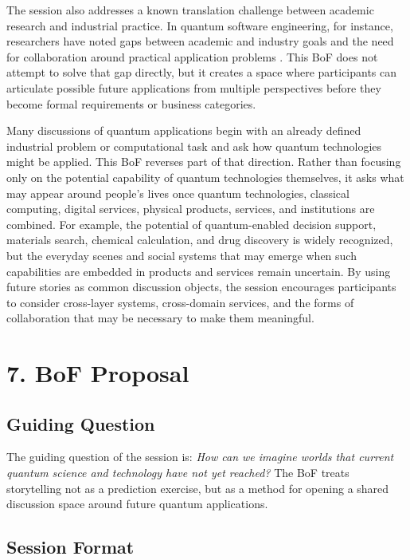 \documentclass[10pt,conference]{IEEEtran}
\begin{document}
The session also addresses a known translation challenge between academic research and industrial practice. In quantum software engineering, for instance, researchers have noted gaps between academic and industry goals and the need for collaboration around practical application problems \cite{zappin}. This BoF does not attempt to solve that gap directly, but it creates a space where participants can articulate possible future applications from multiple perspectives before they become formal requirements or business categories.

Many discussions of quantum applications begin with an already defined industrial problem or computational task and ask how quantum technologies might be applied. This BoF reverses part of that direction. Rather than focusing only on the potential capability of quantum technologies themselves, it asks what may appear around people's lives once quantum technologies, classical computing, digital services, physical products, services, and institutions are combined. For example, the potential of quantum-enabled decision support, materials search, chemical calculation, and drug discovery is widely recognized, but the everyday scenes and social systems that may emerge when such capabilities are embedded in products and services remain uncertain. By using future stories as common discussion objects, the session encourages participants to consider cross-layer systems, cross-domain services, and the forms of collaboration that may be necessary to make them meaningful.

\section*{7. BoF Proposal}

\subsection*{Guiding Question}

The guiding question of the session is: \emph{How can we imagine worlds that current quantum science and technology have not yet reached?} The BoF treats storytelling not as a prediction exercise, but as a method for opening a shared discussion space around future quantum applications.

\subsection*{Session Format}
\end{document}
